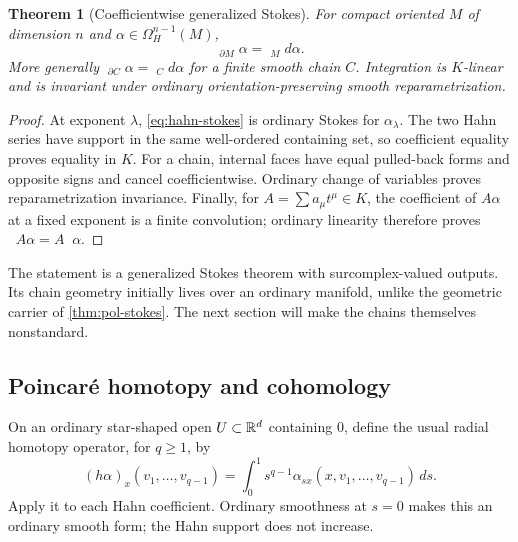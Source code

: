 \documentclass[11pt,letterpaper]{article}
\newtheorem{theorem}{Theorem}[section]
\theoremstyle{definition}
\theoremstyle{remark}
\newcommand{\HInt}{\mathop{\int^{\!H}}\nolimits}\newcommand{\HCoint}{\mathop{\oint^{\!H}}\nolimits}
\numberwithin{equation}{section}
\begin{document}
\begin{theorem}[Coefficientwise generalized Stokes]\label{thm:hahn-stokes}
For compact oriented $M$ of dimension $n$ and $\alpha\in\Omega_H^{n-1}(M)$,
\begin{equation}\label{eq:hahn-stokes}
 \boxed{\quad\HInt_{\partial M}\alpha=\HInt_M d\alpha.\quad}
\end{equation}
More generally $\HInt_{\partial C}\alpha=\HInt_Cd\alpha$ for a finite smooth chain $C$. Integration is $K$-linear and is invariant under ordinary orientation-preserving smooth reparametrization.
\end{theorem}
\begin{proof}
At exponent $\lambda$, \eqref{eq:hahn-stokes} is ordinary Stokes for $\alpha_\lambda$. The two Hahn series have support in the same well-ordered containing set, so coefficient equality proves equality in $K$. For a chain, internal faces have equal pulled-back forms and opposite signs and cancel coefficientwise. Ordinary change of variables proves reparametrization invariance. Finally, for $A=\sum a_\mu t^\mu\in K$, the coefficient of $A\alpha$ at a fixed exponent is a finite convolution; ordinary linearity therefore proves $\HInt A\alpha=A\HInt\alpha$.
\end{proof}

The statement is a generalized Stokes theorem with surcomplex-valued outputs. Its chain geometry initially lives over an ordinary manifold, unlike the geometric carrier of \cref{thm:pol-stokes}. The next section will make the chains themselves nonstandard.

\subsection{Poincar\'e homotopy and cohomology}
On an ordinary star-shaped open $U\subset\mathbb R^d$ containing $0$, define the usual radial homotopy operator, for $q\ge1$, by
\begin{equation}\label{eq:radial}
 (h\alpha)_x(v_1,\ldots,v_{q-1})=
 \int_0^1 s^{q-1}\alpha_{sx}(x,v_1,\ldots,v_{q-1})\,ds.
\end{equation}
Apply it to each Hahn coefficient. Ordinary smoothness at $s=0$ makes this an ordinary smooth form; the Hahn support does not increase.
\end{document}

